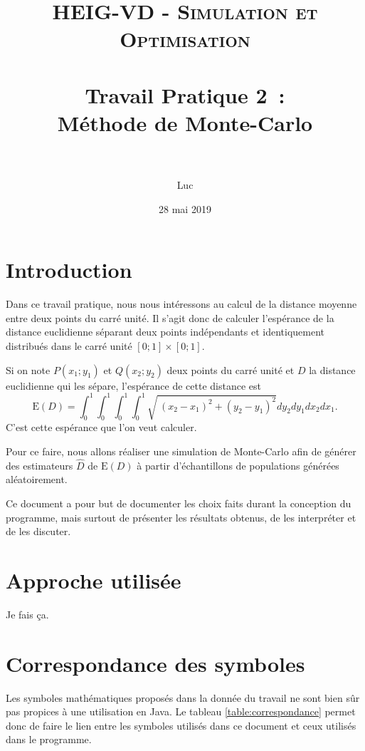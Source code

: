 \documentclass[paper=a4, fontsize=11pt]{scrartcl}
\title{
  \normalfont \normalsize
  \textsc{HEIG-VD - Simulation et Optimisation} \\[10pt]
  \horrule{1pt} \\[0.4cm] %
  \huge Travail Pratique 2~:\\Méthode de Monte-Carlo \\
  \horrule{2pt} \\[0.4cm] %
}
\author{Luc \bsc{Wachter}}
\date{28 mai 2019}
\begin{document}
\lstset{language=Java}

\maketitle

\section{Introduction}

Dans ce travail pratique, nous nous intéressons au calcul de la distance moyenne entre deux points du carré unité. Il s'agit donc de calculer l'espérance de la distance euclidienne séparant deux points indépendants et identiquement distribués dans le carré unité $[0;1] \times [0;1]$.

Si on note $P(x_1;y_1)$ et $Q(x_2;y_2)$ deux points du carré unité et $D$ la distance euclidienne qui les sépare, l'espérance de cette distance est
\begin{equation*}
  \text{E}(D) = \int _0^1\int _0^1\int _0^1\int _0^1\sqrt{\:\left(x_2-x_1\right)^2+\left(y_2-y_1\right)^2}dy_2dy_1dx_2dx_1.
\end{equation*}
C'est cette espérance que l'on veut calculer.

Pour ce faire, nous allons réaliser une simulation de Monte-Carlo afin de générer des estimateurs $\widehat{D}$ de $\text{E}(D)$ à partir d'échantillons de populations générées aléatoirement.

Ce document a pour but de documenter les choix faits durant la conception du programme, mais surtout de présenter les résultats obtenus, de les interpréter et de les discuter.

\section{Approche utilisée}

Je fais ça.

\section{Correspondance des symboles}

Les symboles mathématiques proposés dans la donnée du travail ne sont bien sûr pas propices à une utilisation en Java. Le tableau \ref{table:correspondance} permet donc de faire le lien entre les symboles utilisés dans ce document et ceux utilisés dans le programme.
\end{document}
